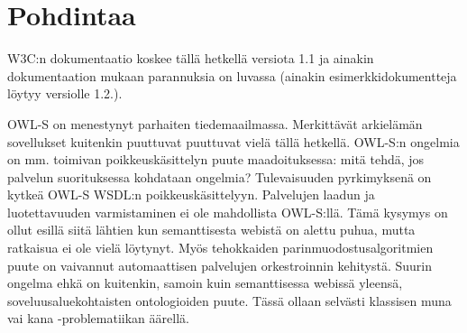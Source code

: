 \documentclass[finnish]{tktltiki2}
\theoremstyle{definition}
\theoremstyle{remark}
\begin{document}
\section{Pohdintaa}

W3C:n dokumentaatio koskee tällä hetkellä versiota 1.1 ja ainakin dokumentaation mukaan parannuksia on luvassa (ainakin esimerkkidokumentteja löytyy versiolle 1.2.)\cite{OWLS}. 

OWL-S on menestynyt parhaiten tiedemaailmassa\cite{with_owls}. Merkittävät arkielämän sovellukset kuitenkin puuttuvat puuttuvat vielä tällä hetkellä. OWL-S:n ongelmia on mm. toimivan poikkeuskäsittelyn puute maadoituksessa\cite{with_owls}: mitä tehdä, jos palvelun suorituksessa kohdataan ongelmia? Tulevaisuuden pyrkimyksenä on kytkeä OWL-S WSDL:n poikkeuskäsittelyyn. Palvelujen laadun ja luotettavuuden varmistaminen ei ole mahdollista OWL-S:llä\cite{with_owls}. Tämä kysymys on ollut esillä siitä lähtien kun semanttisesta webistä on alettu puhua, mutta ratkaisua ei ole vielä löytynyt\cite{semweb}. Myös tehokkaiden parinmuodostusalgoritmien puute on vaivannut automaattisen palvelujen orkestroinnin kehitystä\cite{with_owls}. Suurin ongelma ehkä on kuitenkin, samoin kuin semanttisessa webissä yleensä, soveluusaluekohtaisten ontologioiden puute\cite{with_owls}. Tässä ollaan selvästi klassisen muna vai kana -problematiikan äärellä.    

%
%
% 
%



\end{document}
